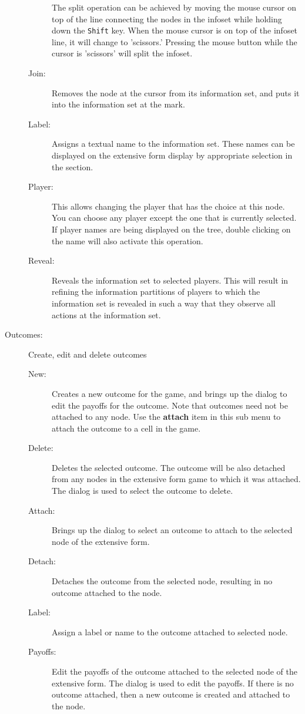 \documentclass[12pt]{report}
\begin{document}
\begin{description}
\begin{description}
 The split operation can be
achieved by moving the mouse cursor on top of the line connecting the
nodes in the infoset while holding down the {\tt Shift} key.  When the
mouse cursor is on top of the infoset line, it will change to
'scissors.'  Pressing the mouse button while the cursor is 'scissors'
will split the infoset.
\item[Join:] Removes the node at the cursor from its information set,
and puts it into the information set at the mark.
\item[Label:] Assigns a textual name to the information set.  These
names can be displayed on the extensive form display by appropriate
selection in the \helpref{}{} section. 
\item[Player:] This allows changing the player that has the choice at
this node.  You can choose any player except the one that is currently
selected.  If player names are being displayed on the tree, double
clicking on the name will also activate this operation.
\item[Reveal:] Reveals the information set to selected players.  This
will result in refining the information partitions of players to which
the information set is revealed in such a way that they observe all
actions at the information set.
\end{description}

\item[Outcomes:] Create, edit and delete outcomes
\begin{description}
\item[New:] Creates a new outcome for the game, and brings up the 
 dialog to edit the payoffs for
the outcome.  Note that outcomes need not be attached to any node.
Use the {\bf attach} item in this sub menu to attach the outcome to a
cell in the game. 
\item[Delete:] Deletes the selected outcome.  The outcome will be also
detached from any nodes in the extensive form game to which it was
attached. The  dialog is used
to select the outcome to delete.
\item[Attach:] Brings up the  
dialog to select an outcome to attach to the selected node of the
extensive form.
\item[Detach:] Detaches the outcome from the selected node, resulting
in no outcome attached to the node.
\item[Label:] Assign a label or name to the outcome attached to
selected node.
\item[Payoffs:] Edit the payoffs of the outcome attached to the
selected node of the extensive form. The  dialog is used to edit the payoffs. If there is
no outcome attached, then a new outcome is created and attached to the
node.
\end{description}


\end{description}
\end{document}
